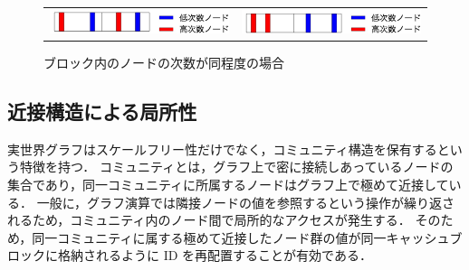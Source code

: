 \begin{figure}[t]
  \begin{tabular}{cc}
    \begin{minipage}[t]{0.45\hsize}
      \centering
      \includegraphics[width=7cm]{./figure/bad_degree_cache.pdf}
      \caption{ブロック内のノードの次数に差がある場合}
      \label{bad_degree_cache}
    \end{minipage} &
    \begin{minipage}[t]{0.45\hsize}
      \centering
      \includegraphics[width=7cm]{./figure/good_degree_cache.pdf}
      \caption{ブロック内のノードの次数が同程度の場合}
      \label{good_degree_cache}
    \end{minipage}
  \end{tabular}
\end{figure}

\subsection{近接構造による局所性}
実世界グラフはスケールフリー性だけでなく，コミュニティ構造を保有するという特徴を持つ\cite{girvan2002community,leskovec2009community}．
コミュニティとは，グラフ上で密に接続しあっているノードの集合であり，同一コミュニティに所属するノードはグラフ上で極めて近接している．
一般に，グラフ演算では隣接ノードの値を参照するという操作が繰り返されるため，コミュニティ内のノード間で局所的なアクセスが発生する．
そのため，同一コミュニティに属する極めて近接したノード群の値が同一キャッシュブロックに格納されるように ID を再配置することが有効である．

